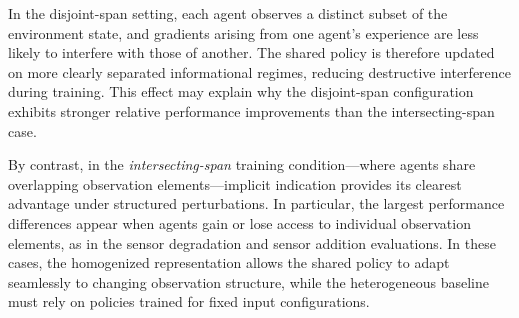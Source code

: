 \documentclass[]{jair}
\newcommand{\Hom}[1]{\widetilde{#1}}
\begin{document}
In the disjoint-span setting, each agent observes a distinct subset of the
environment state, and gradients arising from one agent's experience are less
likely to interfere with those of another. The shared policy is therefore
updated on more clearly separated informational regimes, reducing destructive
interference during training. This effect may explain why the disjoint-span
configuration exhibits stronger relative performance improvements than the
intersecting-span case.

By contrast, in the \emph{intersecting-span} training condition—where agents share
overlapping observation elements—implicit indication provides its clearest advantage
under structured perturbations. In particular, the largest performance differences
appear when agents gain or lose access to individual observation elements, as in the
sensor degradation and sensor addition evaluations. In these cases, the homogenized
representation allows the shared policy to adapt seamlessly to changing observation
structure, while the heterogeneous baseline must rely on policies trained for fixed
input configurations.




\end{document}
